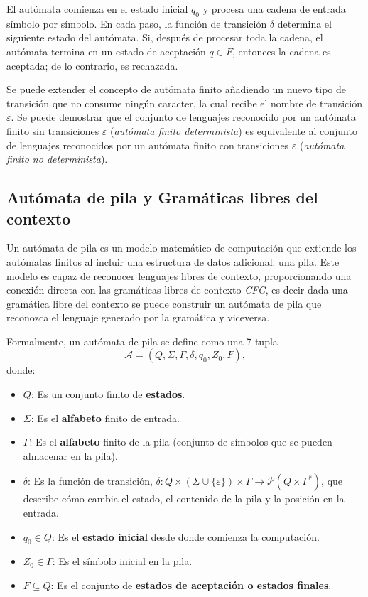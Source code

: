 \documentclass{article}
\begin{document}
El autómata comienza en el estado inicial $q_0$ y procesa una cadena de entrada símbolo por símbolo. En cada paso, la función de transición $\delta$ determina el siguiente estado del autómata. Si, después de procesar toda la cadena, el autómata termina en un estado de aceptación $q \in F$, entonces la cadena es aceptada; de lo contrario, es rechazada.

Se puede extender el concepto de autómata finito añadiendo un nuevo tipo de transición que no consume ningún caracter, la cual recibe el nombre de transición $\varepsilon$.
Se puede demostrar que el conjunto de lenguajes reconocido por un autómata finito sin transiciones $\varepsilon$ (\textit{autómata finito determinista}) es equivalente al conjunto de lenguajes reconocidos por un autómata finito con transiciones $\varepsilon$ (\textit{autómata finito no determinista}).

\subsection{Autómata de pila y Gramáticas libres del contexto}

Un autómata de pila \cite{authomataTheory} es un modelo matemático de computación que extiende los autómatas finitos al incluir una estructura de datos adicional: una pila. Este modelo es capaz de reconocer lenguajes libres de contexto,
proporcionando una conexión directa con las gramáticas libres de contexto \textit{CFG}, es decir dada una gramática libre del contexto se puede construir un autómata de pila que reconozca el lenguaje generado por la gramática y viceversa.

Formalmente, un autómata de pila se define como una 7-tupla
\[
      \mathcal{A} = (Q, \Sigma, \Gamma, \delta, q_0, Z_0, F),
\]
donde:

\begin{itemize}
      \item $Q$: Es un conjunto finito de \textbf{estados}.
      \item $\Sigma$: Es el \textbf{alfabeto} finito de entrada.
      \item $\Gamma$: Es el \textbf{alfabeto} finito de la pila (conjunto de símbolos que se pueden almacenar en la pila).
      \item $\delta$: Es la función de transición, $\delta: Q \times (\Sigma \cup \{\varepsilon\}) \times \Gamma \to \mathcal{P}(Q \times \Gamma^*)$, que describe cómo cambia el estado, el contenido de la pila y la posición en la entrada.
      \item $q_0 \in Q$: Es el \textbf{estado inicial} desde donde comienza la computación.
      \item $Z_0 \in \Gamma$: Es el símbolo inicial en la pila.
      \item $F \subseteq Q$: Es el conjunto de \textbf{estados de aceptación o estados finales}.
\end{itemize}
\end{document}
